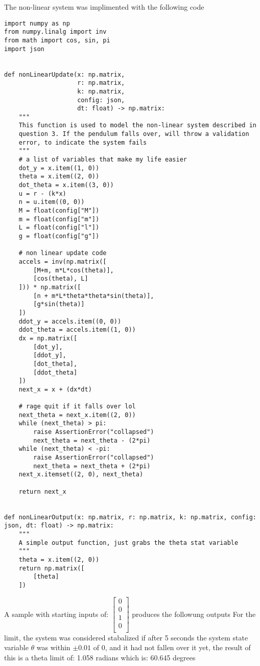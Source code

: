 The non-linear system was implimented with the following code
\begin{verbatim}
import numpy as np
from numpy.linalg import inv
from math import cos, sin, pi
import json


def nonLinearUpdate(x: np.matrix,
                    r: np.matrix,
                    k: np.matrix,
                    config: json,
                    dt: float) -> np.matrix:
    """
    This function is used to model the non-linear system described in
    question 3. If the pendulum falls over, will throw a validation
    error, to indicate the system fails
    """
    # a list of variables that make my life easier
    dot_y = x.item((1, 0))
    theta = x.item((2, 0))
    dot_theta = x.item((3, 0))
    u = r - (k*x)
    n = u.item((0, 0))
    M = float(config["M"])
    m = float(config["m"])
    L = float(config["l"])
    g = float(config["g"])

    # non linear update code
    accels = inv(np.matrix([
        [M+m, m*L*cos(theta)],
        [cos(theta), L]
    ])) * np.matrix([
        [n + m*L*theta*theta*sin(theta)],
        [g*sin(theta)]
    ])
    ddot_y = accels.item((0, 0))
    ddot_theta = accels.item((1, 0))
    dx = np.matrix([
        [dot_y],
        [ddot_y],
        [dot_theta],
        [ddot_theta]
    ])
    next_x = x + (dx*dt)

    # rage quit if it falls over lol
    next_theta = next_x.item((2, 0))
    while (next_theta) > pi:
        raise AssertionError("collapsed")
        next_theta = next_theta - (2*pi)
    while (next_theta) < -pi:
        raise AssertionError("collapsed")
        next_theta = next_theta + (2*pi)
    next_x.itemset((2, 0), next_theta)

    return next_x


def nonLinearOutput(x: np.matrix, r: np.matrix, k: np.matrix, config: json, dt: float) -> np.matrix:
    """
    A simple output function, just grabs the theta stat variable
    """
    theta = x.item((2, 0))
    return np.matrix([
        [theta]
    ])
\end{verbatim}
A sample with starting inputs of: $\begin{bmatrix}
0\\
0\\
1\\
0\\
\end{bmatrix}
$ produces the followung outputs
For the limit, the system was considered stabalized if after 5 seconds the system state variable $\theta$ was within $\pm0.01$ of 0, and it had not fallen over it yet, the result of this is a theta limit of: 1.058 radians which is: 60.645 degrees
